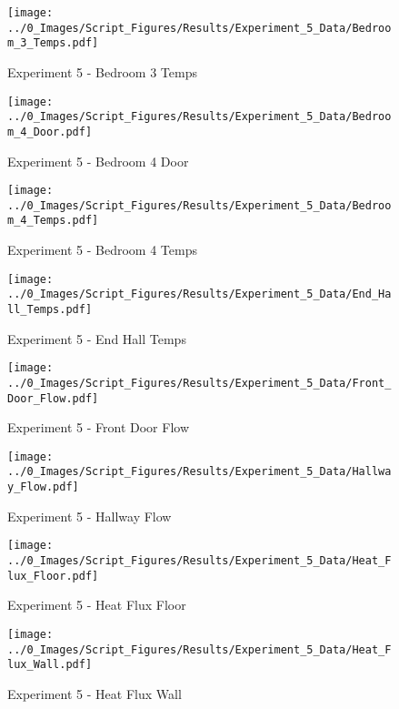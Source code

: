 	\begin{figure}[H]
		\centering
		\texttt{[image: ../0\_Images/Script\_Figures/Results/Experiment\_5\_Data/Bedroom\_3\_Temps.pdf]}
		\caption[]{Experiment 5 - Bedroom 3 Temps}
	\end{figure}
 
	\clearpage

	\begin{figure}[H]
		\centering
		\texttt{[image: ../0\_Images/Script\_Figures/Results/Experiment\_5\_Data/Bedroom\_4\_Door.pdf]}
		\caption[]{Experiment 5 - Bedroom 4 Door}
	\end{figure}
 

	\begin{figure}[H]
		\centering
		\texttt{[image: ../0\_Images/Script\_Figures/Results/Experiment\_5\_Data/Bedroom\_4\_Temps.pdf]}
		\caption[]{Experiment 5 - Bedroom 4 Temps}
	\end{figure}
 
	\clearpage

	\begin{figure}[H]
		\centering
		\texttt{[image: ../0\_Images/Script\_Figures/Results/Experiment\_5\_Data/End\_Hall\_Temps.pdf]}
		\caption[]{Experiment 5 - End Hall Temps}
	\end{figure}
 

	\begin{figure}[H]
		\centering
		\texttt{[image: ../0\_Images/Script\_Figures/Results/Experiment\_5\_Data/Front\_Door\_Flow.pdf]}
		\caption[]{Experiment 5 - Front Door Flow}
	\end{figure}
 
	\clearpage

	\begin{figure}[H]
		\centering
		\texttt{[image: ../0\_Images/Script\_Figures/Results/Experiment\_5\_Data/Hallway\_Flow.pdf]}
		\caption[]{Experiment 5 - Hallway Flow}
	\end{figure}
 

	\begin{figure}[H]
		\centering
		\texttt{[image: ../0\_Images/Script\_Figures/Results/Experiment\_5\_Data/Heat\_Flux\_Floor.pdf]}
		\caption[]{Experiment 5 - Heat Flux Floor}
	\end{figure}
 
	\clearpage

	\begin{figure}[H]
		\centering
		\texttt{[image: ../0\_Images/Script\_Figures/Results/Experiment\_5\_Data/Heat\_Flux\_Wall.pdf]}
		\caption[]{Experiment 5 - Heat Flux Wall}
	\end{figure}
 

